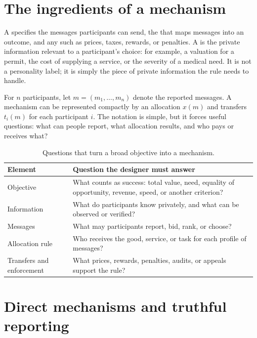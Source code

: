 \section{The ingredients of a mechanism}

A  specifies the messages participants can send, the
 that maps messages into an outcome, and any
 such as prices, taxes, rewards, or penalties. A
 is the private information relevant to a participant's choice:
for example, a valuation for a permit, the cost of supplying a service, or the
severity of a medical need. It is not a personality label; it is simply the
piece of private information the rule needs to handle.

For \(n\) participants, let \(m=(m_1,\ldots,m_n)\) denote the reported
messages. A mechanism can be represented compactly by an allocation
\(x(m)\) and transfers \(t_i(m)\) for each participant \(i\). The notation is
simple, but it forces useful questions: what can people report, what allocation
results, and who pays or receives what?

\begin{table}[htbp]
  \centering
  \small
  \renewcommand{\arraystretch}{1.18}
  \begin{tabular}{p{3.25cm}p{8.25cm}}
    \toprule
    Element & Question the designer must answer\\
    \midrule
    Objective & What counts as success: total value, need, equality of opportunity, revenue, speed, or another criterion?\\
    Information & What do participants know privately, and what can be observed or verified?\\
    Messages & What may participants report, bid, rank, or choose?\\
    Allocation rule & Who receives the good, service, or task for each profile of messages?\\
    Transfers and enforcement & What prices, rewards, penalties, audits, or appeals support the rule?\\
    \bottomrule
  \end{tabular}
  \caption{Questions that turn a broad objective into a mechanism.}
  \label{tab:mechanism-elements}
\end{table}
\FloatBarrier

\section{Direct mechanisms and truthful reporting}

